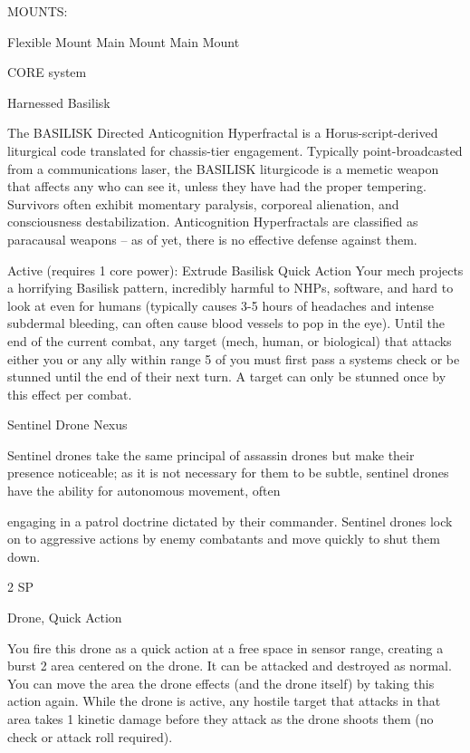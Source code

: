                                                   MOUNTS: 

 Flexible Mount                    Main Mount                             Main Mount 

                                                CORE system 

                                             Harnessed Basilisk   

 The BASILISK Directed Anticognition Hyperfractal is a Horus-script-derived liturgical code translated for  
 chassis-tier engagement. Typically point-broadcasted from a communications laser, the BASILISK  
 liturgicode is a memetic weapon that affects any who can see it, unless they have had the proper  
 tempering. Survivors often exhibit momentary paralysis, corporeal alienation, and consciousness  
 destabilization. Anticognition Hyperfractals are classified as paracausal weapons -- as of yet, there is no  
 effective defense against them.     

 Active (requires 1 core power):  
 Extrude Basilisk  
 Quick Action  
 Your mech projects a horrifying Basilisk pattern, incredibly harmful to NHPs, software, and hard to look  
 at even for humans (typically causes 3-5 hours of headaches and intense subdermal bleeding, can  
 often cause blood vessels to pop in the eye). Until the end of the current combat, any target (mech,  
 human, or biological) that attacks either you or any ally within range 5 of you must first pass a systems  
 check or be stunned until the end of their next turn. A target can only be stunned once by this effect per  
 combat. 

Sentinel Drone Nexus  

Sentinel drones take the same principal of assassin drones but make their presence noticeable; as it is not  
necessary for them to be subtle, sentinel drones have the ability for autonomous movement, often  

                                                                                                             


engaging in a patrol doctrine dictated by their commander. Sentinel drones lock on to aggressive actions  
by enemy combatants and move quickly to shut them down.  

2 SP
 
Drone, Quick Action
 
You fire this drone as a quick action at a free space in sensor range, creating a burst 2 area  
centered on the drone. It can be attacked and destroyed as normal. You can move the area the  
drone effects (and the drone itself) by taking this action again. While the drone is active, any  
hostile target that attacks in that area takes 1 kinetic damage before they attack as the drone  
shoots them (no check or attack roll required).
 

